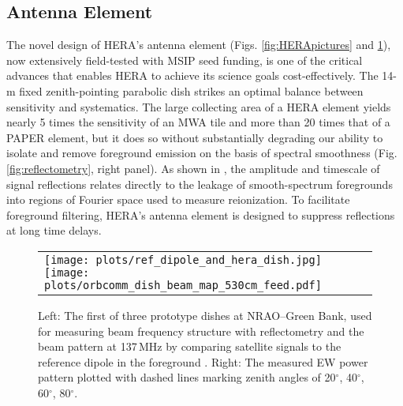\documentclass[preprint,11pt]{aastex}
\newcommand{\Mycitet}[1]{\citet{#1}}
\begin{document}
\vspace{-20pt}
\subsection{Antenna Element}
\label{sec:antenna}
\vspace{-5pt}

\noindent The novel design of HERA's antenna element (Figs. \ref{fig:HERApictures} and \ref{fig:orbcommexptandbeammap}), now extensively field-tested with MSIP seed funding, 
is one of the critical advances that enables HERA to achieve its science
goals cost-effectively.  The 14-m fixed zenith-pointing parabolic dish strikes an optimal
balance between sensitivity and systematics.  The large collecting area of a
HERA element yields nearly 5 times the sensitivity of an MWA tile and more
than 20 times that of a PAPER element, but it does so without substantially
degrading our ability to isolate and remove foreground emission on the basis of
spectral smoothness (Fig. \ref{fig:reflectometry}, right panel).  As shown in
\Mycitet{parsons_et_al2012b}, the amplitude and timescale of signal reflections
relates directly to the leakage of smooth-spectrum foregrounds into regions of Fourier space 
used to measure reionization.
To facilitate foreground filtering, HERA's antenna element is designed to suppress reflections at long time delays.

\begin{figure}[tb]
	\vspace{-5pt}
	\begin{tabular}{ll}
	\begin{minipage}{4.2in}
\texttt{[image: plots/ref\_dipole\_and\_hera\_dish.jpg]}
\texttt{[image: plots/orbcomm\_dish\_beam\_map\_530cm\_feed.pdf]}
	\end{minipage} & 
	\begin{minipage}{2.05in}
	\caption{Left: The first of three prototype dishes at NRAO--Green Bank, used for measuring beam frequency structure with reflectometry and the beam pattern at 137\,MHz by comparing satellite signals to the reference dipole in the foreground \citep{neben_et_al2016}. Right: The measured EW power pattern plotted with dashed lines marking zenith angles of 20$^\circ$, 40$^\circ$, 60$^\circ$, 80$^\circ$.} 
	\label{fig:orbcommexptandbeammap}
	\end{minipage}
	\end{tabular}
	\vspace{-15pt}
\end{figure}
\end{document}
